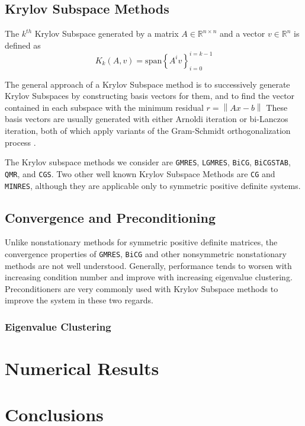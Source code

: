 \documentclass[10pt]{article}
\newcommand\norm[1]{\left\lVert #1 \right\rVert}
\begin{document}
\begin{multicols}{2}
\subsection{Krylov Subspace Methods}

The $k^{th}$ Krylov Subspace generated by a matrix $A \in \mathbb{R}^{n\times n}$ and a vector $v \in \mathbb{R}^n$ is defined as
\begin{equation}
	K_k(A,v) = \mbox{span}\left\{A^iv\right\}_{i=0}^{i=k-1}
\end{equation}

The general approach of a Krylov Subspace method is to successively generate Krylov Subspaces by constructing basis vectors for them, and to find the vector contained in each subspace with the minimum residual $r = \norm{Ax-b}$
These basis vectors are usually generated with either Arnoldi iteration or bi-Lanczos iteration, both of which apply variants of the Gram-Schmidt orthogonalization process \citep{ghai_comparison_2016}.

The Krylov subspace methods we consider are \texttt{GMRES}, \texttt{LGMRES}, \texttt{BiCG}, \texttt{BiCGSTAB}, \texttt{QMR}, and \texttt{CGS}.
Two other well known Krylov Subspace Methods are \texttt{CG} and \texttt{MINRES}, although they are applicable only to symmetric positive definite systems.

\subsection{Convergence and Preconditioning}
Unlike nonstationary methods for symmetric positive definite matrices, the convergence properties of \texttt{GMRES}, \texttt{BiCG} and other nonsymmetric nonstationary methods are not well understood.
Generally, performance tends to worsen with increasing condition number and improve with increasing eigenvalue clustering.
Preconditioners are very commonly used with Krylov Subspace methods to improve the system in these two regards.

\subsubsection{Eigenvalue Clustering}

\section{Numerical Results}

\section{Conclusions}



\end{multicols}
\end{document}
